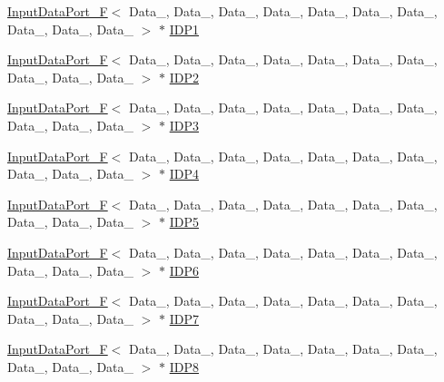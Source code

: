 \begin{DoxyCompactItemize}
\hyperlink{classInputDataPort__F}{Input\+Data\+Port\+\_\+F}$<$ Data\+\_, Data\+\_, Data\+\_, Data\+\_, Data\+\_, Data\+\_, Data\+\_, Data\+\_, Data\+\_, Data\+\_ $>$ $\ast$ \hyperlink{classFusion__operator_a758f7524bb515cb07df2cbac6b06cef4}{I\+D\+P1}
\item 
\hyperlink{classInputDataPort__F}{Input\+Data\+Port\+\_\+F}$<$ Data\+\_, Data\+\_, Data\+\_, Data\+\_, Data\+\_, Data\+\_, Data\+\_, Data\+\_, Data\+\_, Data\+\_ $>$ $\ast$ \hyperlink{classFusion__operator_a1c237055f4af1bfed7d18f0f1620b5dc}{I\+D\+P2}
\item 
\hyperlink{classInputDataPort__F}{Input\+Data\+Port\+\_\+F}$<$ Data\+\_, Data\+\_, Data\+\_, Data\+\_, Data\+\_, Data\+\_, Data\+\_, Data\+\_, Data\+\_, Data\+\_ $>$ $\ast$ \hyperlink{classFusion__operator_ae053a7964cd7ba4422303dddda22bb8c}{I\+D\+P3}
\item 
\hyperlink{classInputDataPort__F}{Input\+Data\+Port\+\_\+F}$<$ Data\+\_, Data\+\_, Data\+\_, Data\+\_, Data\+\_, Data\+\_, Data\+\_, Data\+\_, Data\+\_, Data\+\_ $>$ $\ast$ \hyperlink{classFusion__operator_a087dec92bca6e8c5c9f3a8c033db66c2}{I\+D\+P4}
\item 
\hyperlink{classInputDataPort__F}{Input\+Data\+Port\+\_\+F}$<$ Data\+\_, Data\+\_, Data\+\_, Data\+\_, Data\+\_, Data\+\_, Data\+\_, Data\+\_, Data\+\_, Data\+\_ $>$ $\ast$ \hyperlink{classFusion__operator_ae1ea70ef80557cc22efefb7cb5bae955}{I\+D\+P5}
\item 
\hyperlink{classInputDataPort__F}{Input\+Data\+Port\+\_\+F}$<$ Data\+\_, Data\+\_, Data\+\_, Data\+\_, Data\+\_, Data\+\_, Data\+\_, Data\+\_, Data\+\_, Data\+\_ $>$ $\ast$ \hyperlink{classFusion__operator_a380165fcccb240f43de928c329b93ddf}{I\+D\+P6}
\item 
\hyperlink{classInputDataPort__F}{Input\+Data\+Port\+\_\+F}$<$ Data\+\_, Data\+\_, Data\+\_, Data\+\_, Data\+\_, Data\+\_, Data\+\_, Data\+\_, Data\+\_, Data\+\_ $>$ $\ast$ \hyperlink{classFusion__operator_a03fa8722d419112cc6f9d21354453985}{I\+D\+P7}
\item 
\hyperlink{classInputDataPort__F}{Input\+Data\+Port\+\_\+F}$<$ Data\+\_, Data\+\_, Data\+\_, Data\+\_, Data\+\_, Data\+\_, Data\+\_, Data\+\_, Data\+\_, Data\+\_ $>$ $\ast$ \hyperlink{classFusion__operator_afdf3f278a54f1dfeb655889ab7ec9ce7}{I\+D\+P8}
\item 

\end{DoxyCompactItemize}
